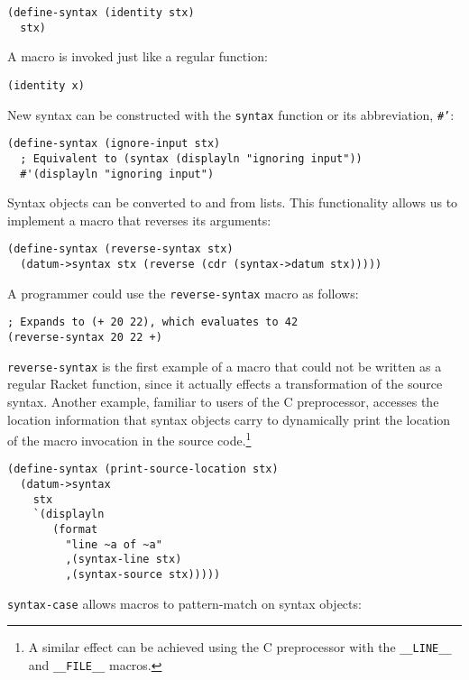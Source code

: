 \documentclass{article}
\begin{document}
\begin{lstlisting}
(define-syntax (identity stx)
  stx)
\end{lstlisting}

A macro is invoked just like a regular function:

\begin{lstlisting}
(identity x)
\end{lstlisting}

New syntax can be constructed with the \texttt{syntax} function or its abbreviation, \texttt{\#'}:

\begin{lstlisting}
(define-syntax (ignore-input stx)
  ; Equivalent to (syntax (displayln "ignoring input"))
  #'(displayln "ignoring input")
\end{lstlisting}

Syntax objects can be converted to and from lists. This functionality allows us to implement a macro that reverses its arguments:

\begin{lstlisting}
(define-syntax (reverse-syntax stx)
  (datum->syntax stx (reverse (cdr (syntax->datum stx)))))
\end{lstlisting}

A programmer could use the \texttt{reverse-syntax} macro as follows:

\begin{lstlisting}
; Expands to (+ 20 22), which evaluates to 42
(reverse-syntax 20 22 +)
\end{lstlisting}

\texttt{reverse-syntax} is the first example of a macro that could not be written as a regular Racket function, since it actually effects a transformation of the source syntax. Another example, familiar to users of the C preprocessor, accesses the location information that syntax objects carry to dynamically print the location of the macro invocation in the source code.\footnote{A similar effect can be achieved using the C preprocessor with the \texttt{\_\_LINE\_\_} and \texttt{\_\_FILE\_\_} macros.}

\begin{lstlisting}
(define-syntax (print-source-location stx)
  (datum->syntax
    stx
    `(displayln
       (format
         "line ~a of ~a"
         ,(syntax-line stx)
         ,(syntax-source stx)))))
\end{lstlisting}

\texttt{syntax-case} allows macros to pattern-match on syntax objects:
\end{document}
